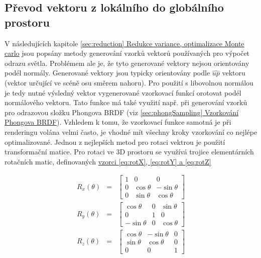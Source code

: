 \documentclass[czech,master,dept460,male,cpp,cpdeclaration]{diploma}
\newcommand{\uvec}[1]{\hat{#1}}
\begin{document}
\subsection{Převod vektoru z lokálního do globálního prostoru}
V následujících kapitole \hyperref[sec:reduction]{\ref{sec:reduction} Redukce variance, optimalizace Monte carlo} jsou popsány metody generování vzorků vektorů používaných pro výpočet odrazu světla. Problémem ale je, že tyto generované vektory nejsou orientovány podél normály. Generované vektory jsou typicky orientovány podle $\uvec{up}$ vektoru (vektor určující ve scéně osu směrem nahoru). Pro použití s libovolnou normálou je tedy nutné výsledný vektor vygenerované vzorkovací funkcí orotovat podél normálového vektoru. Tato funkce má také využití např. při generování vzorků pro odrazovou složku Phongova BRDF (viz \hyperref[sec:phongSampling]{\ref{sec:phongSampling} Vzorkování Phongova BRDF}). Vzhledem k tomu, že vzorkovací funkce samotná je při renderingu volána velmi často, je vhodné mít všechny kroky vzorkování co nejlépe optimalizované. Jednou z nejlepších metod pro rotaci vektrou je použití transformační matice. Pro rotaci ve 3D prostoru se využívá trojice elementárních rotačních matic, definovaných \hyperref[eq:rotX]{vzorci \ref{eq:rotX}, \ref{eq:rotY} a \ref{eq:rotZ}} \cite{HughesDamEtAl13}\par
\begin{eqnarray}
    R_x(\theta) & = & \begin{bmatrix}
        1 & 0          & 0           \\
        0 & \cos\theta & -\sin\theta \\
        0 & \sin\theta & \cos\theta
    \end{bmatrix} \label{eq:rotX} \\
    R_y(\theta) & = & \begin{bmatrix}
        \cos\theta  & 0 & \sin\theta \\
        0           & 1 & 0          \\
        -\sin\theta & 0 & \cos\theta
    \end{bmatrix} \label{eq:rotY} \\
    R_z(\theta) & = & \begin{bmatrix}
        \cos\theta & -\sin\theta & 0 \\
        \sin\theta & \cos\theta  & 0 \\
        0          & 0           & 1
    \end{bmatrix}\label{eq:rotZ}
\end{eqnarray}
\end{document}
